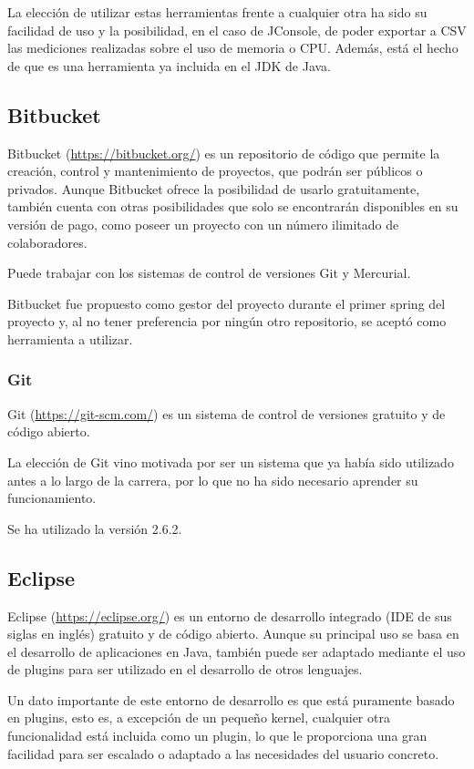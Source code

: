 La elección de utilizar estas herramientas frente a cualquier otra ha sido su facilidad de uso y la posibilidad, en el caso de JConsole, de poder exportar a CSV las mediciones realizadas sobre el uso de memoria o CPU. Además, está el hecho de que es una herramienta ya incluida en el JDK de Java.

\subsection{Bitbucket}\label{DefBitbucket}
Bitbucket (\url{https://bitbucket.org/}) es un repositorio de código que permite la creación, control y mantenimiento de proyectos, que podrán ser públicos o privados. Aunque Bitbucket ofrece la posibilidad de usarlo gratuitamente, también cuenta con otras posibilidades que solo se encontrarán disponibles en su versión de pago, como poseer un proyecto con un número ilimitado de colaboradores.

Puede trabajar con los sistemas de control de versiones Git y Mercurial.

Bitbucket fue propuesto como gestor del proyecto durante el primer spring del proyecto y, al no tener preferencia por ningún otro repositorio, se aceptó como herramienta a utilizar.

\subsubsection{Git}

Git (\url{https://git-scm.com/}) es un sistema de control de versiones gratuito y de código abierto.

La elección de Git vino motivada por ser un sistema que ya había sido utilizado antes a lo largo de la carrera, por lo que no ha sido necesario aprender su funcionamiento.

Se ha utilizado la versión 2.6.2.

\subsection{Eclipse}
Eclipse (\url{https://eclipse.org/}) es un entorno de desarrollo integrado (IDE de sus siglas en inglés) gratuito y de código abierto. Aunque su principal uso se basa en el desarrollo de aplicaciones en Java, también puede ser adaptado mediante el uso de plugins para ser utilizado en el desarrollo de otros lenguajes.

Un dato importante de este entorno de desarrollo es que está puramente basado en plugins, esto es, a excepción de un pequeño kernel, cualquier otra funcionalidad está incluida como un plugin, lo que le proporciona una gran facilidad para ser escalado o adaptado a las necesidades del usuario concreto.

